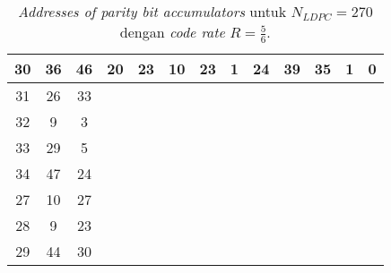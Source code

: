 \begin{table}[tb]
	\centering
	\caption{\textit{Addresses of parity bit accumulators} untuk $N_{LDPC}=270$ dengan \textit{code rate} $R=\frac{5}{6}$.}
	\label{table:rate2}
\begin{tabular}{|c|c|c|cccccccccc}
	\hline
	30 & 36 & 46 & \multicolumn{1}{c|}{20} & \multicolumn{1}{c|}{23} & \multicolumn{1}{c|}{10} & \multicolumn{1}{c|}{23} & \multicolumn{1}{c|}{1} & \multicolumn{1}{c|}{24} & \multicolumn{1}{c|}{39} & \multicolumn{1}{c|}{35} & \multicolumn{1}{c|}{1} & \multicolumn{1}{c|}{0} \\ \hline
	31 & 26 & 33 &                         &                         &                         &                         &                        &                         &                         &                         &                        &                        \\ \cline{1-3}
	32 & 9  & 3  &                         &                         &                         &                         &                        &                         &                         &                         &                        &                        \\ \cline{1-3}
	33 & 29 & 5  &                         &                         &                         &                         &                        &                         &                         &                         &                        &                        \\ \cline{1-3}
	34 & 47 & 24 &                         &                         &                         &                         &                        &                         &                         &                         &                        &                        \\ \cline{1-3}
	27 & 10 & 27 &                         &                         &                         &                         &                        &                         &                         &                         &                        &                        \\ \cline{1-3}
	28 & 9  & 23 &                         &                         &                         &                         &                        &                         &                         &                         &                        &                        \\ \cline{1-3}
	29 & 44 & 30 &                         &                         &                         &                         &                        &                         &                         &                         &                        &                        \\ \cline{1-3}

\end{tabular}
\end{table}
